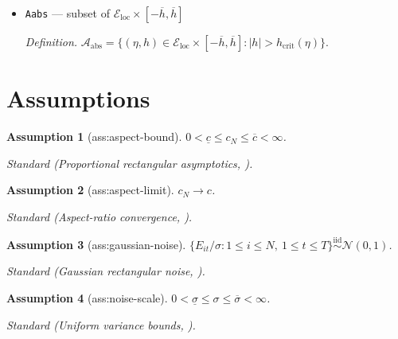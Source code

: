 \documentclass{article}
\newtheorem{assumption}{Assumption}
\begin{document}
\begin{itemize}
  \par\smallskip\noindent\emph{Definition.} \(h_{\mathrm{crit}}(\eta)=c^{1/4}/[\kappa s_1(C_\eta)]\), where \(C_\eta=\begin{pmatrix}0&|\mu_a|\sqrt{v_b}\\|\mu_b|\sqrt{v_a}&\sqrt{v_av_b}\end{pmatrix}\).
  \item \texttt{Aabs} --- subset of \(\mathcal E_{\mathrm{loc}}\times[-\overline h,\overline h]\)
  \par\smallskip\noindent\emph{Definition.} \(\mathcal A_{\mathrm{abs}}=\{(\eta,h)\in\mathcal E_{\mathrm{loc}}\times[-\overline h,\overline h]:|h|>h_{\mathrm{crit}}(\eta)\}\).
\end{itemize}

\section{Assumptions}

\begin{assumption}[ass:aspect-bound]\label{ass:aspect-bound}
\(0<\underline c\le c_N\le\overline c<\infty\).
\par\smallskip\noindent\emph{Standard} (Proportional rectangular asymptotics, \cite{BenaychGeorgesNadakuditi2012}).
\end{assumption}

\begin{assumption}[ass:aspect-limit]\label{ass:aspect-limit}
\(c_N\to c\).
\par\smallskip\noindent\emph{Standard} (Aspect-ratio convergence, \cite{BenaychGeorgesNadakuditi2012}).
\end{assumption}

\begin{assumption}[ass:gaussian-noise]\label{ass:gaussian-noise}
\(\{E_{it}/\sigma:1\le i\le N,\ 1\le t\le T\}\stackrel{\mathrm{iid}}{\sim}\mathcal N(0,1)\).
\par\smallskip\noindent\emph{Standard} (Gaussian rectangular noise, \cite{Onatski2012}).
\end{assumption}

\begin{assumption}[ass:noise-scale]\label{ass:noise-scale}
\(0<\underline\sigma\le\sigma\le\overline\sigma<\infty\).
\par\smallskip\noindent\emph{Standard} (Uniform variance bounds, \cite{ArmstrongWeidnerZeleneev2026}).
\end{assumption}
\end{document}
